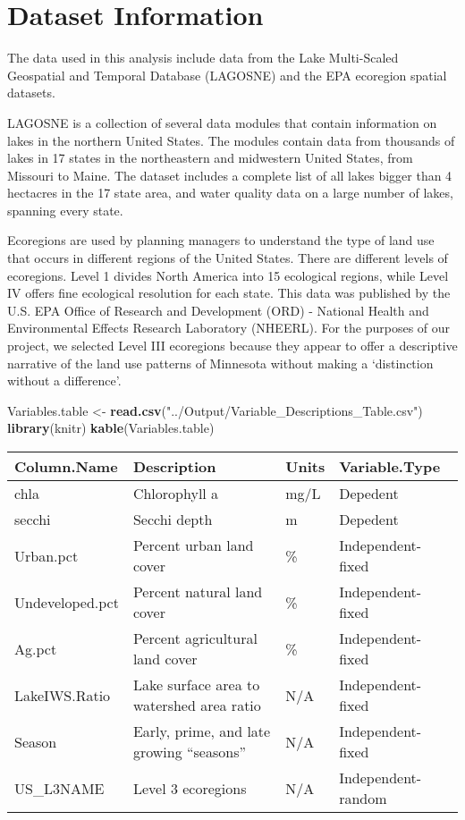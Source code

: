 \documentclass[12pt,]{article}
\newenvironment{Shaded}{\begin{snugshade}}{\end{snugshade}}
\newcommand{\KeywordTok}[1]{\textcolor[rgb]{0.13,0.29,0.53}{\textbf{#1}}}
\newcommand{\NormalTok}[1]{#1}
\newcommand{\StringTok}[1]{\textcolor[rgb]{0.31,0.60,0.02}{#1}}
\begin{document}
\newpage

\hypertarget{dataset-information}{%
\section{Dataset Information}\label{dataset-information}}

The data used in this analysis include data from the Lake Multi-Scaled
Geospatial and Temporal Database (LAGOSNE) and the EPA ecoregion spatial
datasets.

LAGOSNE is a collection of several data modules that contain information
on lakes in the northern United States. The modules contain data from
thousands of lakes in 17 states in the northeastern and midwestern
United States, from Missouri to Maine. The dataset includes a complete
list of all lakes bigger than 4 hectacres in the 17 state area, and
water quality data on a large number of lakes, spanning every state.

Ecoregions are used by planning managers to understand the type of land
use that occurs in different regions of the United States. There are
different levels of ecoregions. Level 1 divides North America into 15
ecological regions, while Level IV offers fine ecological resolution for
each state. This data was published by the U.S. EPA Office of Research
and Development (ORD) - National Health and Environmental Effects
Research Laboratory (NHEERL). For the purposes of our project, we
selected Level III ecoregions because they appear to offer a descriptive
narrative of the land use patterns of Minnesota without making a
`distinction without a difference'.

\begin{Shaded}
\begin{Highlighting}[]
\NormalTok{Variables.table <-}\StringTok{ }\KeywordTok{read.csv}\NormalTok{(}\StringTok{"../Output/Variable_Descriptions_Table.csv"}\NormalTok{)}
\KeywordTok{library}\NormalTok{(knitr)}
\KeywordTok{kable}\NormalTok{(Variables.table)}
\end{Highlighting}
\end{Shaded}

\begin{longtable}[]{@{}llll@{}}
\toprule
Column.Name & Description & Units & Variable.Type\tabularnewline
\midrule
\endhead
chla & Chlorophyll a & mg/L & Depedent\tabularnewline
secchi & Secchi depth & m & Depedent\tabularnewline
Urban.pct & Percent urban land cover & \% & Independent-
fixed\tabularnewline
Undeveloped.pct & Percent natural land cover & \% & Independent-
fixed\tabularnewline
Ag.pct & Percent agricultural land cover & \% & Independent-
fixed\tabularnewline
LakeIWS.Ratio & Lake surface area to watershed area ratio & N/A &
Independent- fixed\tabularnewline
Season & Early, prime, and late growing ``seasons'' & N/A & Independent-
fixed\tabularnewline
US\_L3NAME & Level 3 ecoregions & N/A & Independent-
random\tabularnewline
\bottomrule
\end{longtable}
\end{document}
